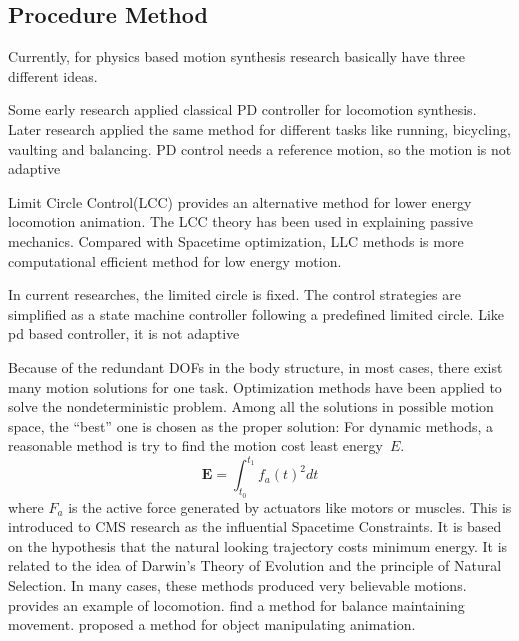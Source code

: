 \subsection{Procedure Method}
Currently, for physics based motion synthesis research basically have three different ideas.
\begin{itemize}
Some early research applied classical PD controller \citep{Raibert1991} for locomotion synthesis.
Later research \citep{Hodgins1995} applied the same method for different tasks like running, bicycling, vaulting and balancing. 
PD control needs a reference motion, so the motion is not adaptive


Limit Circle Control(LCC) \citep{Laszlo1996} provides an alternative method for lower energy locomotion animation. 
The LCC theory has been used in explaining passive mechanics.  
Compared with Spacetime optimization, LLC methods is more computational efficient method for low energy motion.

In current researches\citep{Coros2009,Laszlo1996}, the limited circle is fixed.
The control strategies are simplified as a state machine controller following a predefined limited circle.
Like pd based controller, it is not adaptive



 


Because of the redundant DOFs in the body structure, in most cases, there exist many motion solutions for one task.
Optimization methods have been applied to solve the nondeterministic problem. 
Among all the solutions in possible motion space, the ``best'' one is chosen as the proper solution:
For dynamic methods, a reasonable method is try to find the motion cost least energy~$E$. 
\begin{equation}
 \textbf{E}=\int_{t_0}^{t_1}f_{a}(t)^2dt
\end{equation}
where $F_{a}$ is the active force generated by actuators like motors or muscles. 
This is introduced to CMS research as the influential Spacetime Constraints\citep{Witkin1988}. 
It is based on the hypothesis that the natural looking trajectory costs minimum energy. 
It is related to the idea of Darwin's Theory of Evolution and the principle of Natural Selection. 
In many cases, these methods produced very believable motions. 
\citet{Jain2009} provides an example of locomotion.  
\citet{BalanceControl} find a method for balance maintaining movement. 
\citet{Liu2009} proposed a method for object manipulating animation. 
\end{itemize}
